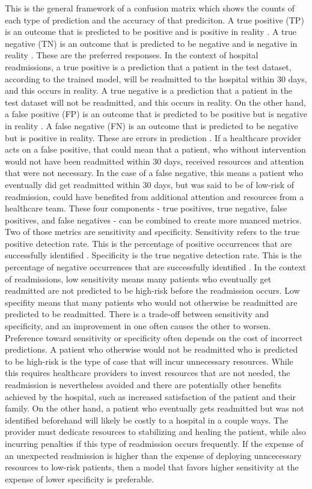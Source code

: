 \documentclass[sigconf]{acmart}
\begin{document}
This is the general framework of a confusion matrix which shows the counts of each type of prediction and the accuracy of that prediciton. A true positive (TP) is an outcome that is predicted to be positive and is positive in reality \cite{cite12}. A true negative (TN) is an outcome that is predicted to be negative and is negative in reality \cite{cite12}. These are the preferred responses. In the context of hospital readmissions, a true positive is a prediction that a patient in the test dataset, according to the trained model, will be readmitted to the hospital within 30 days, and this occurs in reality. A true negative is a prediction that a patient in the test dataset will not be readmitted, and this occurs in reality.
On the other hand, a false positive (FP) is an outcome that is predicted to be positive but is negative in reality \cite{cite12}. A false negative (FN) is an outcome that is predicted to be negative but is positive in reality. These are errors in prediction \cite{cite12}. If a healthcare provider acts on a false positive, that could mean that a patient, who without intervention would not have been readmitted within 30 days, received resources and attention that were not necessary. In the case of a false negative, this means a patient who eventually did get readmitted within 30 days, but was said to be of low-risk of readmission, could have benefited from additional attention and resources from a healthcare team. 
These four components - true positives, true negative, false positives, and false negatives - can be combined to create more nuanced metrics. Two of those metrics are sensitivity and specificity. Sensitivity refers to the true positive detection rate. This is the percentage of positive occurrences that are successfully identified \cite{cite12}. Specificity is the true negative detection rate. This is the percentage of negative occurrences that are successfully identified \cite{cite12}.
In the context of readmissions, low sensitivity means many patients who eventually get readmitted are not predicted to be high-risk before the readmission occurs. Low specifity means that many patients who would not otherwise be readmitted are predicted to be readmitted. There is a trade-off between sensitivity and specificity, and an improvement in one often causes the other to worsen. Preference toward sensitivity or specificity often depends on the cost of incorrect predictions.
A patient who otherwise would not be readmitted who is predicted to be high-risk is the type of case that will incur unnecessary resources. While this requires healthcare providers to invest resources that are not needed, the readmission is nevertheless avoided and there are potentially other benefits achieved by the hospital, such as increased satisfaction of the patient and their family. On the other hand, a patient who eventually gets readmitted but was not identified beforehand will likely be costly to a hospital in a couple ways. The provider must dedicate resources to stabilizing and healing the patient, while also incurring penalties if this type of readmission occurs frequently. If the expense of an unexpected readmission is higher than the expense of deploying unncecessary resources to low-risk patients, then a model that favors higher sensitivity at the expense of lower specificity is preferable.
\end{document}
